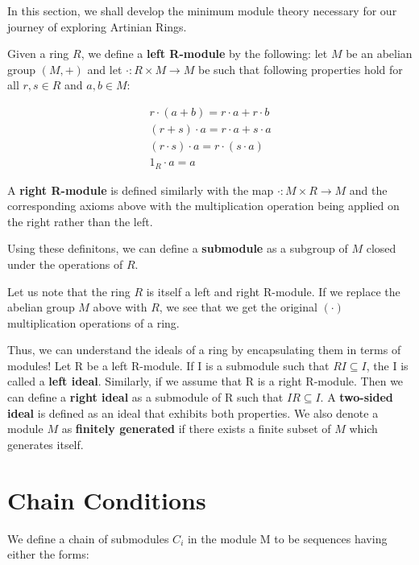 \documentclass[11pt]{article}
\begin{document}
In this section, we shall develop the minimum module theory necessary for our journey of exploring Artinian Rings. \newline

Given a ring $R$, we define a \textbf{left R-module} by the following: let $M$ be an abelian group $(M,+)$ and let $\cdot:R \times M \rightarrow M$ be such that following properties hold for all $r,s \in R$ and $a,b \in M$: 

\begin{gather}
 r \cdot (a + b) = r\cdot a + r\cdot b \\
 (r + s)\cdot a = r\cdot a + s\cdot a \\
 (r\cdot s)\cdot a = r\cdot(s\cdot a) \\
 1_R\cdot a = a
\end{gather}

A \textbf{right R-module} is defined similarly with the map $\cdot:M \times R \rightarrow M$ and the corresponding axioms above with the multiplication operation being applied on the right rather than the left.\newline

Using these definitons, we can define a \textbf{submodule} as a subgroup of $M$ closed under the operations of $R$. \newline

Let us note that the ring $R$ is itself a left and right R-module. If we replace the abelian group $M$ above with $R$, we see that we get the original $(\cdot)$ multiplication operations of a ring. \newline

Thus, we can understand the ideals of a ring by encapsulating them in terms of modules! Let R be a left R-module. If I is a submodule such that $RI \subseteq I$, the I is called a \textbf{left ideal}. Similarly, if we assume that R is a
right R-module. Then we can define a \textbf{right ideal} as a submodule of R such that $IR \subseteq I$. A \textbf{two-sided ideal} is defined as an ideal that exhibits both properties. We also denote a module $M$ as \textbf{finitely generated} if there exists a finite subset of $M$ which generates itself. \newline


\section{Chain Conditions}

We define a chain of submodules $C_i$ in the module M to be sequences having either the forms:
\end{document}
